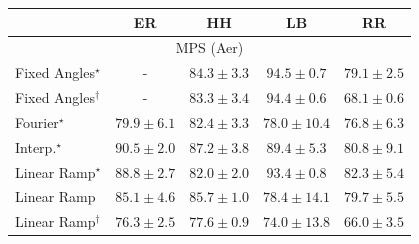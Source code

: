 \begin{tabular}{l|cccc|}
\toprule
            & ER & HH & LB & RR \\
\midrule
\multicolumn{5}{c}{\rule{0pt}{8pt}MPS (Aer)} \\
\midrule
Fixed Angles$^\star$ & {\cellcolor[HTML]{000000}} \color[HTML]{F1F1F1} {\cellcolor{white}} \color{black} - & {\cellcolor[HTML]{88449E}} \color[HTML]{F1F1F1} $84.3\pm 3.3$ & {\cellcolor[HTML]{540251}} \color[HTML]{F1F1F1} $94.5\pm 0.7$ & {\cellcolor[HTML]{8C6DB2}} \color[HTML]{F1F1F1} $79.1\pm 2.5$ \\
Fixed Angles$^\dagger$ & {\cellcolor[HTML]{000000}} \color[HTML]{F1F1F1} {\cellcolor{white}} \color{black} - & {\cellcolor[HTML]{894CA2}} \color[HTML]{F1F1F1} $83.3\pm 3.4$ & {\cellcolor[HTML]{550253}} \color[HTML]{F1F1F1} $94.4\pm 0.6$ & {\cellcolor[HTML]{A2BFDB}} \color[HTML]{000000} $68.1\pm 0.6$ \\
Fourier$^\star$ & {\cellcolor[HTML]{8C66AF}} \color[HTML]{F1F1F1} $79.9\pm 6.1$ & {\cellcolor[HTML]{8A52A5}} \color[HTML]{F1F1F1} $82.4\pm 3.3$ & {\cellcolor[HTML]{8C75B6}} \color[HTML]{F1F1F1} $78.0\pm 10.4$ & {\cellcolor[HTML]{8C80BB}} \color[HTML]{F1F1F1} $76.8\pm 6.3$ \\
Interp.$^\star$ & {\cellcolor[HTML]{7B0D76}} \color[HTML]{F1F1F1} $90.5\pm 2.0$ & {\cellcolor[HTML]{85288D}} \color[HTML]{F1F1F1} $87.2\pm 3.8$ & {\cellcolor[HTML]{82147F}} \color[HTML]{F1F1F1} $89.4\pm 5.3$ & {\cellcolor[HTML]{8B60AC}} \color[HTML]{F1F1F1} $80.8\pm 9.1$ \\
Linear Ramp$^\star$ & {\cellcolor[HTML]{831A83}} \color[HTML]{F1F1F1} $88.8\pm 2.7$ & {\cellcolor[HTML]{8A55A7}} \color[HTML]{F1F1F1} $82.0\pm 2.0$ & {\cellcolor[HTML]{5F055C}} \color[HTML]{F1F1F1} $93.4\pm 0.8$ & {\cellcolor[HTML]{8A54A6}} \color[HTML]{F1F1F1} $82.3\pm 5.4$ \\
Linear Ramp & {\cellcolor[HTML]{873D9A}} \color[HTML]{F1F1F1} $85.1\pm 4.6$ & {\cellcolor[HTML]{873696}} \color[HTML]{F1F1F1} $85.7\pm 1.0$ & {\cellcolor[HTML]{8C72B5}} \color[HTML]{F1F1F1} $78.4\pm 14.1$ & {\cellcolor[HTML]{8C68AF}} \color[HTML]{F1F1F1} $79.7\pm 5.5$ \\
Linear Ramp$^\dagger$ & {\cellcolor[HTML]{8C84BD}} \color[HTML]{F1F1F1} $76.3\pm 2.5$ & {\cellcolor[HTML]{8C79B8}} \color[HTML]{F1F1F1} $77.6\pm 0.9$ & {\cellcolor[HTML]{8C95C6}} \color[HTML]{F1F1F1} $74.0\pm 13.8$ & {\cellcolor[HTML]{AFC8E0}} \color[HTML]{000000} $66.0\pm 3.5$ \\

\end{tabular}
